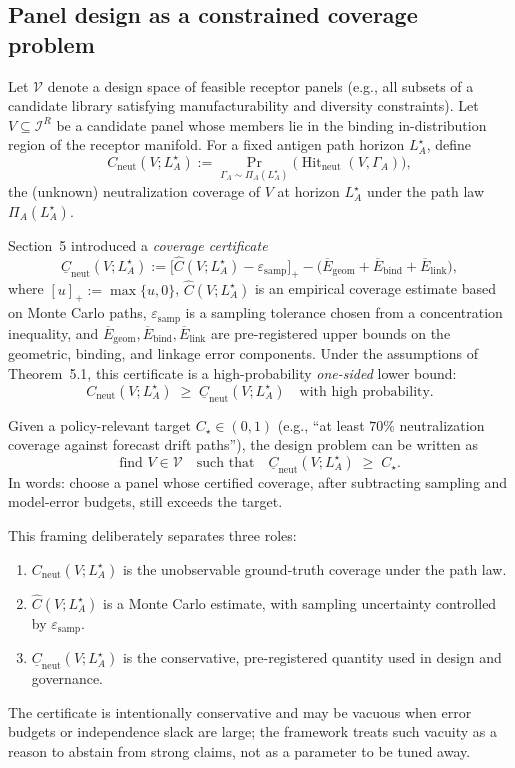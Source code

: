 \documentclass[11pt]{article}
\newcommand{\Hit}{\operatorname{Hit}}
\begin{document}
\subsection{Panel design as a constrained coverage problem}

Let $\mathcal{V}$ denote a design space of feasible receptor panels (e.g., all subsets of a candidate
library satisfying manufacturability and diversity constraints). Let
$V \subseteq \mathcal{I}^R$ be a candidate panel whose members lie in the binding in-distribution
region of the receptor manifold. For a fixed antigen path horizon $L_A^\star$, define
\[
  C_{\mathrm{neut}}(V;L_A^\star)
  := \Pr_{\Gamma_A \sim \Pi_A(L_A^\star)}\!\bigl(
       \Hit_{\mathrm{neut}}(V,\Gamma_A)
     \bigr),
\]
the (unknown) neutralization coverage of $V$ at horizon $L_A^\star$ under the path law
$\Pi_A(L_A^\star)$.

Section~5 introduced a \emph{coverage certificate}
\[
  \underline{C}_{\mathrm{neut}}(V;L_A^\star)
  :=
  \bigl[\widehat{C}(V;L_A^\star) - \varepsilon_{\mathrm{samp}}\bigr]_+
  - \bigl(\overline{E}_{\mathrm{geom}} + \overline{E}_{\mathrm{bind}} + \overline{E}_{\mathrm{link}}\bigr),
\]
where $[u]_+ := \max\{u,0\}$, $\widehat{C}(V;L_A^\star)$ is an empirical coverage estimate based on
Monte Carlo paths, $\varepsilon_{\mathrm{samp}}$ is a sampling tolerance chosen from a concentration
inequality, and $\overline{E}_{\mathrm{geom}},\overline{E}_{\mathrm{bind}},\overline{E}_{\mathrm{link}}$ are
pre-registered upper bounds on the geometric, binding, and linkage error components. Under the
assumptions of Theorem~5.1, this certificate is a high-probability \emph{one-sided} lower bound:
\[
  C_{\mathrm{neut}}(V;L_A^\star)
  \;\ge\;
  \underline{C}_{\mathrm{neut}}(V;L_A^\star)
  \quad\text{with high probability.}
\]

Given a policy-relevant target $C_\star \in (0,1)$ (e.g., ``at least $70\%$ neutralization coverage
against forecast drift paths''), the design problem can be written as
\begin{equation}
\label{eq:design-problem}
  \text{find } V \in \mathcal{V}
  \quad\text{such that}\quad
  \underline{C}_{\mathrm{neut}}(V;L_A^\star) \;\ge\; C_\star.
\end{equation}
In words: choose a panel whose certified coverage, after subtracting sampling and model-error
budgets, still exceeds the target.

This framing deliberately separates three roles:
\begin{enumerate}
  \item $C_{\mathrm{neut}}(V;L_A^\star)$ is the unobservable ground-truth coverage under the path
  law.
  \item $\widehat{C}(V;L_A^\star)$ is a Monte Carlo estimate, with sampling uncertainty controlled
  by $\varepsilon_{\mathrm{samp}}$.
  \item $\underline{C}_{\mathrm{neut}}(V;L_A^\star)$ is the conservative, pre-registered quantity
  used in design and governance.
\end{enumerate}
The certificate is intentionally conservative and may be vacuous when error budgets or independence
slack are large; the framework treats such vacuity as a reason to abstain from strong claims, not as
a parameter to be tuned away.
\end{document}
